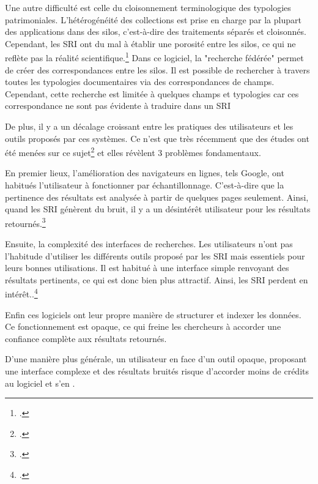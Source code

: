 Une autre difficulté est celle du cloisonnement terminologique des typologies patrimoniales. L'hétérogénéité des collections est prise en charge par la plupart des applications dans des silos, c'est-à-dire des traitements séparés et cloisonnés. Cependant, les \gls{SRI} ont du mal à établir une porosité entre les silos, ce qui ne reflète pas la réalité scientifique.\footcite[p.274]{koolenInformationRetrievalCultural2013} Dans ce logiciel, la "recherche fédérée" permet de créer des correspondances entre les silos. Il est possible de rechercher à travers toutes les typologies documentaires via des correspondances de champs. Cependant, cette recherche est limitée à quelques champs et typologies car ces correspondance ne sont pas évidente à traduire dans un \gls{SRI}\newline
	
De plus, il y a un décalage croissant entre les pratiques des utilisateurs et les outils proposés par ces systèmes. Ce n'est que très récemment que des études ont été menées sur ce sujet\footcite{warwickIfYouBuild2007} et elles révèlent 3 problèmes fondamentaux.

En premier lieux, l'amélioration des navigateurs en lignes, tels Google, ont habitués l'utilisateur à fonctionner par échantillonnage. C'est-à-dire que la pertinence des résultats est analysée à partir de quelques pages seulement. Ainsi, quand les \gls{SRI} génèrent du bruit, il y a un désintérêt utilisateur pour les résultats retournés.\footcite[p.9]{warwickIfYouBuild2007}
		
\label{modalités-recherches} Ensuite, la complexité des interfaces de recherches. Les utilisateurs n'ont pas l'habitude d'utiliser les différents outils proposé par les \gls{SRI} mais essentiels pour leurs bonnes utilisations. Il est habitué à une interface simple renvoyant des résultats pertinents, ce qui est donc bien plus attractif. Ainsi, les \gls{SRI} perdent en intérêt..\footcite[p.23-24]{warwickIfYouBuild2007}
		
\label{opaque} Enfin ces logiciels ont leur propre manière de structurer et indexer les données. Ce fonctionnement est opaque, ce qui freine les chercheurs à accorder une confiance complète aux résultats retournés.\newline
	
D'une manière plus générale, un utilisateur en face d'un outil opaque, proposant une interface complexe et des résultats bruités risque d'accorder moins de crédits au logiciel et s'en .
	
